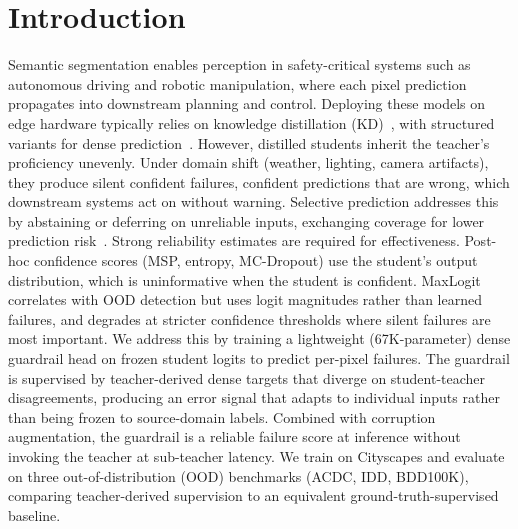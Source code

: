 \documentclass{article}
\begin{document}
\section{Introduction}
Semantic segmentation enables perception in safety-critical systems such as autonomous driving and robotic manipulation, where each pixel prediction propagates into downstream planning and control. Deploying these models on edge hardware typically relies on knowledge distillation (KD)~\cite{hinton2015distilling}, with structured variants for dense prediction~\cite{liu2019structuredkd}. However, distilled students inherit the teacher's proficiency unevenly. Under domain shift (weather, lighting, camera artifacts), they produce silent confident failures, confident predictions that are wrong, which downstream systems act on without warning. Selective prediction addresses this by abstaining or deferring on unreliable inputs, exchanging coverage for lower prediction risk~\cite{geifman2017selective}. Strong reliability estimates are required for effectiveness. Post-hoc confidence scores (MSP, entropy, MC-Dropout) use the student's output distribution, which is uninformative when the student is confident. MaxLogit correlates with OOD detection but uses logit magnitudes rather than learned failures, and degrades at stricter confidence thresholds where silent failures are most important.
We address this by training a lightweight (67K-parameter) dense guardrail head on frozen student logits to predict per-pixel failures. The guardrail is supervised by teacher-derived dense targets that diverge on student-teacher disagreements, producing an error signal that adapts to individual inputs rather than being frozen to source-domain labels. Combined with corruption augmentation, the guardrail is a reliable failure score at inference without invoking the teacher at sub-teacher latency. We train on Cityscapes and evaluate on three out-of-distribution (OOD) benchmarks (ACDC, IDD, BDD100K), comparing teacher-derived supervision to an equivalent ground-truth-supervised baseline.
\end{document}
